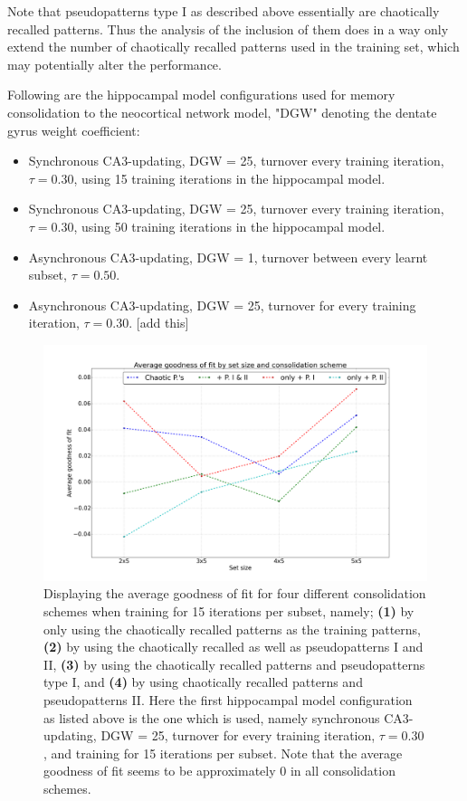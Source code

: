 Note that pseudopatterns type I as described above essentially are chaotically recalled patterns. Thus the analysis of the inclusion of them does in a way only extend the number of chaotically recalled patterns used in the training set, which may potentially alter the performance.

Following are the hippocampal model configurations used for memory consolidation to the neocortical network model, "DGW" denoting the dentate gyrus weight coefficient:

\begin{itemize}
    \item Synchronous CA3-updating, DGW = 25, turnover every training iteration, $\tau=0.30$, using 15 training iterations in the hippocampal model.
    \item Synchronous CA3-updating, DGW = 25, turnover every training iteration, $\tau=0.30$, using 50 training iterations in the hippocampal model.
    \item Asynchronous CA3-updating, DGW = 1, turnover between every learnt subset, $\tau=0.50$.
    \item Asynchronous CA3-updating, DGW = 25, turnover for every training iteration, $\tau=0.30$. [add this]
\end{itemize}

\begin{figure}
    \centering
    \includegraphics[width=14cm]{fig/neo-consolidation/consolidation-schemes-sync-tm1-tr30_15_iters}
    \caption{Displaying the average goodness of fit for four different consolidation schemes when training for 15 iterations per subset, namely; \textbf{(1)} by only using the chaotically recalled patterns as the training patterns, \textbf{(2)} by using the chaotically recalled as well as pseudopatterns I and II, \textbf{(3)} by using the chaotically recalled patterns and pseudopatterns type I, and \textbf{(4)} by using chaotically recalled patterns and pseudopatterns II. Here the first hippocampal model configuration as listed above is the one which is used, namely synchronous CA3-updating, DGW = 25, turnover for every training iteration, $\tau=0.30$, and training for 15 iterations per subset. Note that the average goodness of fit seems to be approximately 0 in all consolidation schemes.}
    \label{fig:consolidation-schemes-sync}
\end{figure}

